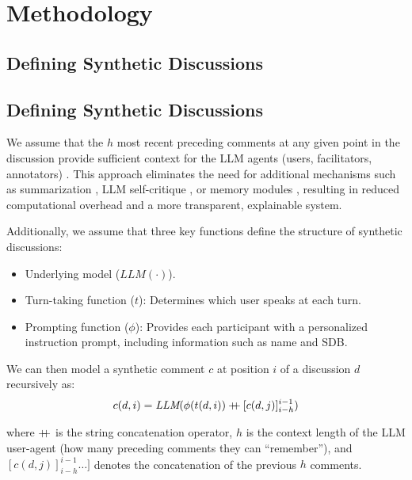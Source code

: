 %

\section{Methodology}
\label{sec:methodology}

\subsection{Defining Synthetic Discussions}
\subsection{Defining Synthetic Discussions}
\label{ssec:methodology:discussions}

We assume that the $h$ most recent preceding comments at any given point in the discussion provide sufficient context for the \ac{LLM} agents (users, facilitators, annotators) \cite{pavlopoulos_2020_toxicity}. This approach eliminates the need for additional mechanisms such as summarization \cite{balog_2024}, \ac{LLM} self-critique \cite{yu_2024_fincon}, or memory modules \cite{Vezhnevets2023GenerativeAM}, resulting in reduced computational overhead and a more transparent, explainable system.

Additionally, we assume that three key functions define the structure of synthetic discussions:
\begin{itemize}[nosep, noitemsep]
    \item Underlying model ($\textit{LLM}(\cdot)$).
    \item Turn-taking function ($t$): Determines which user speaks at each turn.
    \item Prompting function ($\phi$): Provides each participant with a personalized instruction prompt, including information such as name and \ac{SDB}.
\end{itemize}

We can then model a synthetic comment $c$ at position $i$ of a discussion $d$ recursively as:
\begin{equation}
\label{eq:comment}
    c(d, i) = \textit{LLM}(\phi(t(d, i)) \mathbin{{+}\mspace{-8mu}{+}} [c(d, j)]^{i-1}_{i-h})
\end{equation}

\noindent where $\mathbin{{+}\mspace{-8mu}{+}}$ is the string concatenation operator, $h$ is the context length of the \ac{LLM} user-agent (how many preceding comments they can “remember”), and $[c(d,j)]_{i-h}^{i-1}\dots]$ denotes the concatenation of the previous $h$ comments.

